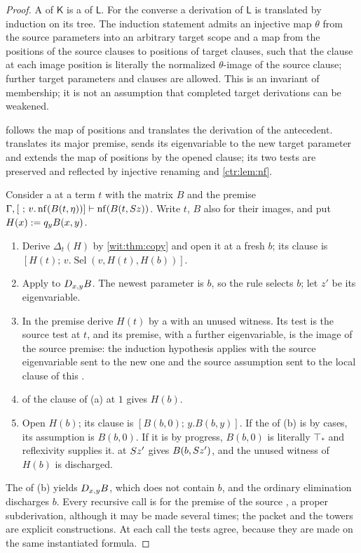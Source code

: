 \begin{proof}
A  of $\mathsf{K}$ is a  of $\mathsf{L}$.
For the converse a derivation of $\mathsf{L}$ is translated by induction on
its tree.  The induction statement admits an injective map $\theta$ from the
source parameters into an arbitrary target scope and a map from the
positions of the source clauses to positions of target clauses, such that
the clause at each image position is literally the normalized
$\theta$-image of the source clause; further target parameters and clauses
are allowed.  This is an invariant of membership; it is not an assumption
that completed target derivations can be weakened.

 follows the map of positions and translates the derivation
of the antecedent.   translates its major premise, sends
its eigenvariable to the new target parameter and extends the map of
positions by the opened clause; its two tests are preserved and reflected by
injective renaming and \cref{ctr:lem:nf}.

Consider a  at a term $t$ with the matrix $B$ and the
premise $\Gamma,[\ ;\,v.\nf(B(t,\eta))]\proves\nf(B(t,\Suc z))$.  Write
$t$, $B$ also for their images, and put $H(x)\mathrel{:=} q_yB(x,y)$.
\begin{enumerate}[label=\textup{(\alph*)}]
\item Derive $\Delta_t(H)$ by \cref{wit:thm:copy} and open it at a fresh
 $b$; its clause is $[H(t);\,v.\operatorname{Sel}(v,H(t),H(b))]$.
\item Apply  to $D_{x,y}B$.  The newest parameter is $b$,
 so the rule selects $b$; let $z'$ be its eigenvariable.
\item In the premise derive $H(t)$ by a  with an unused
 witness.  Its test is the source test at $t$, and its premise, with a
 further eigenvariable, is the image of the source premise: the induction
 hypothesis applies with the source eigenvariable sent to the new one and
 the source assumption sent to the local clause of this .
\item {} of the clause of (a) at $1$ gives $H(b)$.
\item Open $H(b)$; its clause is $[B(b,0);\,y.B(b,y)]$.  If the
  of (b) is by cases, its assumption is $B(b,0)$.  If it is
 by progress, $B(b,0)$ is literally $\top_{*}$ and reflexivity supplies it.
  at $S z'$ gives $B(b,S z')$, and the unused witness
 of $H(b)$ is discharged.
\end{enumerate}
The  of (b) yields $D_{x,y}B$, which does not contain $b$,
and the ordinary elimination discharges $b$.  Every recursive call is for
the premise of the source , a proper subderivation, although
it may be made several times; the packet and the towers are explicit
constructions.  At each call the tests agree, because they are made on the
same instantiated formula.
\end{proof}

